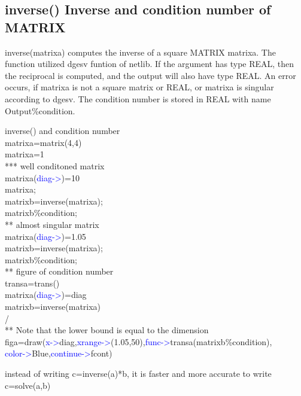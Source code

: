 \subsection{\textcolor{VioletRed}{inverse}() Inverse and condition number of MATRIX}
\label{inverse}
\textcolor{VioletRed}{inverse}(matrixa) computes the inverse of a square MATRIX matrixa. The function utilized dgesv funtion
of netlib. If the argument has type REAL, then the reciprocal is computed,
and the output will also have type REAL. An error occurs, if matrixa is not
a square matrix or REAL, or matrixa is singular according to dgesv.
The condition number is stored in REAL with name Output\%condition.
\begin{example}[inverseex]inverse() and condition number\\
\label{inverseex}
matrixa=\textcolor{VioletRed}{matrix}(4,4)\\
matrixa=1\\
***  well conditoned matrix\\
matrixa(\textcolor{blue}{diag->})=10\\
matrixa;\\
matrixb=\textcolor{VioletRed}{inverse}(matrixa);\\
matrixb\%condition;\\
** almost singular matrix\\
matrixa(\textcolor{blue}{diag->})=1.05\\
matrixb=\textcolor{VioletRed}{inverse}(matrixa);\\
matrixb\%condition;\\
** figure of condition number\\
transa=\textcolor{VioletRed}{trans}()\\
matrixa(\textcolor{blue}{diag->})=diag\\
matrixb=\textcolor{VioletRed}{inverse}(matrixa)\\
/\\
** Note that the lower bound is equal to the dimension\\
figa=\textcolor{VioletRed}{draw}(\textcolor{blue}{x->}diag,\textcolor{blue}{xrange->}(1.05,50),\textcolor{blue}{func->}transa(matrixb\%condition),\\
\textcolor{blue}{color->}Blue,\textcolor{blue}{continue->}fcont)
\end{example}
\begin{note}
instead of writing c=\textcolor{VioletRed}{inverse}(a)*b, it is faster and more accurate to
write c=\textcolor{VioletRed}{solve}(a,b)
\end{note}
